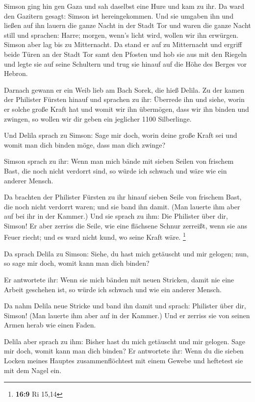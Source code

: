  Simson ging hin gen Gaza und sah daselbst eine Hure und
kam zu ihr.  Da ward den Gazitern gesagt: Simson ist
hereingekommen. Und sie umgaben ihn und ließen auf ihn lauern die ganze
Nacht in der Stadt Tor und waren die ganze Nacht still und sprachen:
Harre; morgen, wenn's licht wird, wollen wir ihn erwürgen.
 Simson aber lag bis zu Mitternacht. Da stand er auf zu
Mitternacht und ergriff beide Türen an der Stadt Tor samt den Pfosten
und hob sie aus mit den Riegeln und legte sie auf seine Schultern und
trug sie hinauf auf die Höhe des Berges vor Hebron.

 Darnach gewann er ein Weib lieb am Bach Sorek, die hieß
Delila.  Zu der kamen der Philister Fürsten hinauf und
sprachen zu ihr: Überrede ihn und siehe, worin er solche große Kraft hat
und womit wir ihn übermögen, dass wir ihn binden und zwingen, so wollen
wir dir geben ein jeglicher 1100 Silberlinge.

 Und Delila sprach zu Simson: Sage mir doch, worin deine
große Kraft sei und womit man dich binden möge, dass man dich zwinge?

 Simson sprach zu ihr: Wenn man mich bände mit sieben
Seilen von frischem Bast, die noch nicht verdorrt sind, so würde ich
schwach und wäre wie ein anderer Mensch.

 Da brachten der Philister Fürsten zu ihr hinauf sieben
Seile von frischem Bast, die noch nicht verdorrt waren; und sie band ihn
damit.  (Man lauerte ihm aber auf bei ihr in der Kammer.)
Und sie sprach zu ihm: Die Philister über dir, Simson! Er aber zerriss
die Seile, wie eine flächsene Schnur zerreißt, wenn sie ans Feuer
riecht; und es ward nicht kund, wo seine Kraft wäre. \footnote{\textbf{16:9}
  Ri 15,14}

 Da sprach Delila zu Simson: Siehe, du hast mich
getäuscht und mir gelogen; nun, so sage mir doch, womit kann man dich
binden?

 Er antwortete ihr: Wenn sie mich bänden mit neuen
Stricken, damit nie eine Arbeit geschehen ist, so würde ich schwach und
wie ein anderer Mensch.

 Da nahm Delila neue Stricke und band ihn damit und
sprach: Philister über dir, Simson! (Man lauerte ihm aber auf in der
Kammer.) Und er zerriss sie von seinen Armen herab wie einen Faden.

 Delila aber sprach zu ihm: Bisher hast du mich getäuscht
und mir gelogen. Sage mir doch, womit kann man dich binden? Er
antwortete ihr: Wenn du die sieben Locken meines Hauptes
zusammenflöchtest mit einem Gewebe und heftetest sie mit dem Nagel ein.

